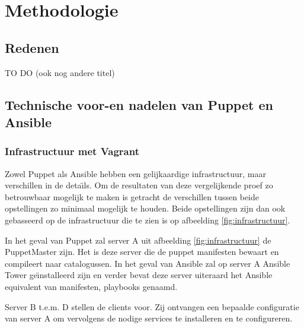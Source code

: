 
\chapter{Methodologie}
\label{ch:methodologie}

\section{Redenen}
\label{sec:Redenen}

TO DO (ook nog andere titel)

\section{ Technische voor-en nadelen van Puppet en Ansible}
\label{sec: technische-voor-en-nadelen-van-Puppet-en-Ansible}

\subsection{ Infrastructuur met Vagrant}
\label{sec: infrastructuur-met-Vagrant}

Zowel Puppet als Ansible hebben een gelijkaardige infrastructuur, maar verschillen in de deta{\"\i}ls. Om de resultaten van deze vergelijkende proef zo betrouwbaar mogelijk te maken is getracht de verschillen tussen beide opstellingen zo minimaal mogelijk te houden. Beide opstellingen zijn dan ook gebasseerd op de infrastructuur die te zien is op afbeelding \ref{fig:infrastructuur}.

In het geval van Puppet zal server A uit afbeelding \ref{fig:infrastructuur} de PuppetMaster zijn. Het is deze server die de puppet manifesten bewaart en compileert naar catalogussen. In het geval van Ansible zal op server A Ansible Tower ge{\"\i}nstalleerd zijn en verder bevat deze server uiteraard het Ansible equivalent van manifesten, playbooks genaamd. 

Server B t.e.m. D stellen de clients voor. Zij ontvangen een bepaalde configuratie van server A om vervolgens de nodige services te installeren en te configureren.

